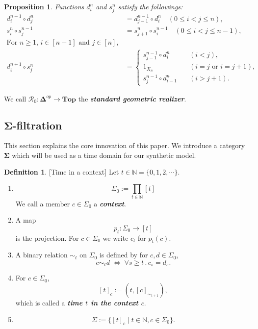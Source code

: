 \documentclass[12pt, a4paper]{amsart}
\theoremstyle{plain}
\newtheorem{prop}[thm]{Proposition}
\theoremstyle{definition}
\newtheorem{defn}[thm]{Definition}
\numberwithin{figure}{section}
\numberwithin{table}{section}
\newcommand{\twc}[2]{ %
  [ #1 ]_{ #2 }
}
\newcommand{\newword}[1]{\textbf{\textit{#1}}}
\numberwithin{equation}{section}
\newcommand{\Top}{\mathbf{Top}}
\newcommand{\bDelta}{\mathbf{\Delta}}
\newcommand{\bSigma}{\mathbf{\Sigma}}
\begin{document}
\begin{prop}
\label{prop:faceDegeMapsForRzero}
Functions
$d^n_i$
and
$s^n_j$
satisfy the followings:
\begin{align}
\label{eq:XSOdeltaDeltaZero}
d^{n-1}_i
	\circ
d^n_j
		&=
d^{n-1}_{j-1}
	\circ
d^n_i 
		\quad
(0 \le i < j \le n),
		\\
\label{eq:XSOsigmaSigmaZero}
s^n_i
	\circ
s^{n-1}_j
		&=
s^n_{j+1}
	\circ
s^{n-1}_i
		\quad
(0 \le i < j \le n-1),
		\\
\nonumber
		\textrm{For }
n \ge 1,
	\,
i \in [n+1]
\textrm{ and }
j \in [n],
		\\
\label{eq:XSOsigmaDeltaZero}
d^{n+1}_i
	\circ
s^n_j
		&=
\begin{cases}
s^{n-1}_{j-1}
	\circ
d^{n}_i
		&\quad
(i < j),
			\\
1_{X_n}
		&\quad
(i = j \textrm{ or } i = j+1),
			\\
s^{n-1}_{j}
	\circ
d^{n}_{i-1}
		&\quad
(i > j+1) .
\end{cases}
\end{align}
\end{prop}

We call
$
\mathcal{R}_0 : \bDelta^{op} \to \Top
$
the \newword{standard geometric realizer}.



\subsection{$\bSigma$-filtration}
\label{sec:SigmaFilt}

This section explains the core innovation of this paper.
We introduce a category
$\bSigma$
which will be used as a time domain for our synthetic model.



\begin{defn}{[Time in a context]}
\label{defn:timeInContextu}
Let 
$
t 
	\in
\mathbb{N}
	=
\{0, 1, 2, \cdots\}
$.
\begin{enumerate}
\item
\[
\Sigma_0
	:=
\prod_{t \in \mathbb{N}}
	[t]
\]
We call a member
$
c \in \Sigma_0
$
a \newword{context}.

\item
A map
\[
p_t
	:
\Sigma_0 \to [t]
\]
is the projection.
For
$c \in \Sigma_0$
we write
$
c_t
$
for
$
p_t(c)
$.

\item
A binary relation 
$\sim_t$
on
$
\Sigma_0
$
is defined by
%
for
$c, d \in \Sigma_0$,
\[
c
	\sim_t
d
	\; \Leftrightarrow	\;
\forall
s \ge t
	\,.\,
c_s = d_s .
\]

\item
For
$c \in \Sigma_0$,
\[
\twc{t}{c}
	:=
(t, [c]_{\sim_{t+1}}),
\]
which is called a \newword{time $t$ in the context $c$}.

\item
\[
\Sigma
	:=
\{
	\twc{t}{c}
\mid
	t \in \mathbb{N},
	c \in \Sigma_0
\}.
\]
\end{enumerate}
\end{defn}
\end{document}
